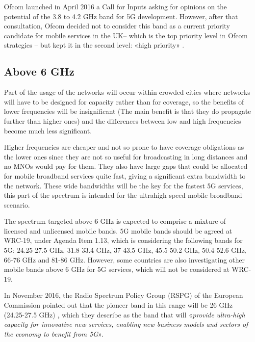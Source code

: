 Ofcom launched in April 2016 a Call for Inputs \cite{1-24} asking for opinions on the potential of the 3.8 to 4.2 GHz band for 5G development. However, after that consultation, Ofcom decided not to consider this band as a current priority \cite{1-25} candidate for mobile services in the UK– which is the top priority level in Ofcom strategies – but kept it in the second level: «high priority» \cite{1-26}. \par

\subsection*{Above 6 GHz}
Part of the usage of the networks will occur within crowded cities where networks will have to be designed for capacity rather than for coverage, so the benefits of lower frequencies will be insignificant (The main benefit is that they do propagate further than higher ones) and the differences between low and high frequencies become much less significant.\par

Higher frequencies are cheaper and not so prone to have coverage obligations as the lower ones since they are not so useful for broadcasting in long distances and no MNOs would pay for them. They also have large gaps that could be allocated for mobile broadband services quite fast, giving a significant extra bandwidth to the network. These wide bandwidths will be the key for the fastest 5G services, this part of the spectrum is intended for the ultrahigh speed mobile broadband scenario. \par

The spectrum targeted above 6 GHz is expected to comprise a mixture of licensed and unlicensed mobile bands. 5G mobile bands should be agreed at WRC-19, under Agenda Item 1.13, \cite{1-27} which is considering the following bands for 5G: 24.25-27.5 GHz, 31.8-33.4 GHz, 37-43.5 GHz, 45.5-50.2 GHz, 50.4-52.6 GHz, 66-76 GHz and 81-86 GHz. However, some countries are also investigating other mobile bands above 6 GHz for 5G services, which will not be considered at WRC-19.\par

In November 2016, the Radio Spectrum Policy Group (RSPG) of the European Commission pointed out that the pioneer band in this range will be 26 GHz (24.25-27.5 GHz) \cite{1-23}, which they describe as the band that will «\textit{provide ultra-high capacity for innovative new services, enabling new business models and sectors of the economy to benefit from 5G}».\par

